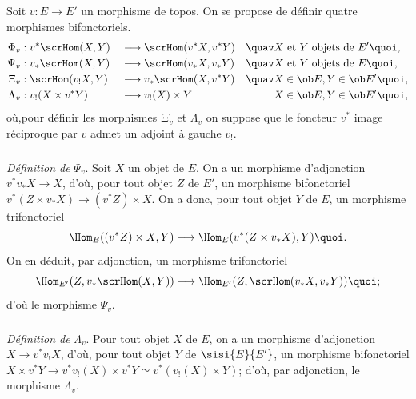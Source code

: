 \documentclass[10pt]{../fichiers-configuration-latex/smfart}
\begin{document}
\subsection{}
Soit $v:E\rightarrow E'$ un morphisme de topos. On se propose de
définir quatre morphismes bifonctoriels.
\begin{alignat*}{4}
\Phi_v & : v^{\ast}\scrHom(X,Y) &&\longrightarrow
\scrHom(v^{\ast}X,v^{\ast}Y) &\quav
& X \text{ et } Y \text{ objets de } E'{\quoi},\\
\Psi_v & : v_{\ast}\scrHom(X,Y) &&\longrightarrow \scrHom(v_{\ast}X,
v_{\ast}Y) &\quav & X \text{ et } Y \text{ objets de } E{\quoi},\\
\Xi_v & : \scrHom(v_{!}X,Y) &&\longrightarrow
v_{\ast}\scrHom(X,v^{\ast}Y) &\quav & X\in \ob E, Y\in \ob
E'{\quoi},\\
\Lambda_v & : v_{!}(X\times v^{\ast}Y) &&\longrightarrow
v_{!}(X)\times Y & & X\in \ob E, Y\in \ob E'{\quoi},
\end{alignat*}
où,\pageoriginale pour définir les morphismes $\Xi_v$ et $\Lambda_v$
on suppose que le foncteur $v^{\ast}$ image réciproque par $v$ admet
un adjoint à gauche $v_{!}$.

\subsubsection{}
\emph{Définition de} $\Psi_v$. Soit $X$ un objet de $E$. On a un
morphisme d'adjonction $v^{\ast}v_{\ast}X\rightarrow X$, d'où, pour
tout objet $Z$ de $E'$, un morphisme bifonctoriel $v^{\ast}(Z\times
v_{\ast}X)\rightarrow (v^{\ast}Z)\times X$. On a donc, pour tout
objet $Y$ de $E$, un morphisme trifonctoriel
$$
\Hom_E((v^{\ast}Z)\times X, Y)\longrightarrow
\Hom_E(v^{\ast}(Z\times v_{\ast}X),Y){\quoi}.
$$
On en déduit, par adjonction, un morphisme trifonctoriel
$$
\Hom_{E'}(Z,v_{\ast}\scrHom(X,Y))\longrightarrow \Hom_{E'}(Z,
\scrHom(v_{\ast}X, v_{\ast}Y)){\quoi};
$$
d'où le morphisme $\Psi_v$.

\subsubsection{}
\emph{Définition de} $\Lambda_v$. Pour tout objet $X$ de $E$, on a
un morphisme d'adjonction $X\rightarrow v^{\ast}v_{!}X$, d'où, pour
tout objet $Y$ de $\sisi{E}{E'}$, un morphisme bifonctoriel $X\times
v^{\ast}Y\rightarrow v^{\ast}v_{!}(X)\times v^{\ast}Y\simeq
v^{\ast}(v_{!}(X)\times Y)$; d'où, par adjonction, le morphisme
$\Lambda_v$.
\end{document}
